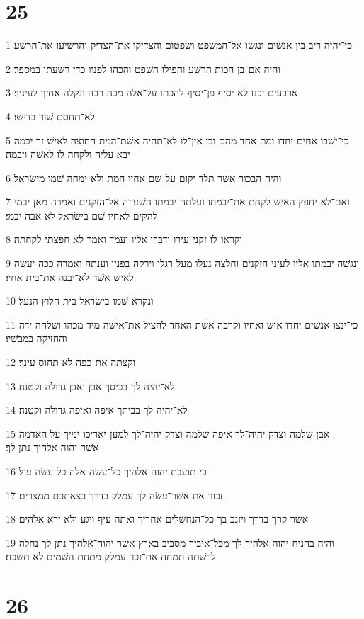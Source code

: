 \chapter{25}

\par 1 כי־יהיה ריב בין אנשׁים ונגשׁו אל־המשׁפט ושׁפטום והצדיקו את־הצדיק והרשׁיעו את־הרשׁע׃
\par 2 והיה אם־בן הכות הרשׁע והפילו השׁפט והכהו לפניו כדי רשׁעתו במספר׃
\par 3 ארבעים יכנו לא יסיף פן־יסיף להכתו על־אלה מכה רבה ונקלה אחיך לעיניך׃
\par 4 לא־תחסם שׁור בדישׁו׃
\par 5 כי־ישׁבו אחים יחדו ומת אחד מהם ובן אין־לו לא־תהיה אשׁת־המת החוצה לאישׁ זר יבמה יבא עליה ולקחה לו לאשׁה ויבמה׃
\par 6 והיה הבכור אשׁר תלד יקום על־שׁם אחיו המת ולא־ימחה שׁמו מישׂראל׃
\par 7 ואם־לא יחפץ האישׁ לקחת את־יבמתו ועלתה יבמתו השׁערה אל־הזקנים ואמרה מאן יבמי להקים לאחיו שׁם בישׂראל לא אבה יבמי׃
\par 8 וקראו־לו זקני־עירו ודברו אליו ועמד ואמר לא חפצתי לקחתה׃
\par 9 ונגשׁה יבמתו אליו לעיני הזקנים וחלצה נעלו מעל רגלו וירקה בפניו וענתה ואמרה ככה יעשׂה לאישׁ אשׁר לא־יבנה את־בית אחיו׃
\par 10 ונקרא שׁמו בישׂראל בית חלוץ הנעל׃
\par 11 כי־ינצו אנשׁים יחדו אישׁ ואחיו וקרבה אשׁת האחד להציל את־אישׁה מיד מכהו ושׁלחה ידה והחזיקה במבשׁיו׃
\par 12 וקצתה את־כפה לא תחוס עינך׃
\par 13 לא־יהיה לך בכיסך אבן ואבן גדולה וקטנה׃
\par 14 לא־יהיה לך בביתך איפה ואיפה גדולה וקטנה׃
\par 15 אבן שׁלמה וצדק יהיה־לך איפה שׁלמה וצדק יהיה־לך למען יאריכו ימיך על האדמה אשׁר־יהוה אלהיך נתן לך׃
\par 16 כי תועבת יהוה אלהיך כל־עשׂה אלה כל עשׂה עול׃
\par 17 זכור את אשׁר־עשׂה לך עמלק בדרך בצאתכם ממצרים׃
\par 18 אשׁר קרך בדרך ויזנב בך כל־הנחשׁלים אחריך ואתה עיף ויגע ולא ירא אלהים׃
\par 19 והיה בהניח יהוה אלהיך לך מכל־איביך מסביב בארץ אשׁר יהוה־אלהיך נתן לך נחלה לרשׁתה תמחה את־זכר עמלק מתחת השׁמים לא תשׁכח׃

\chapter{26}

